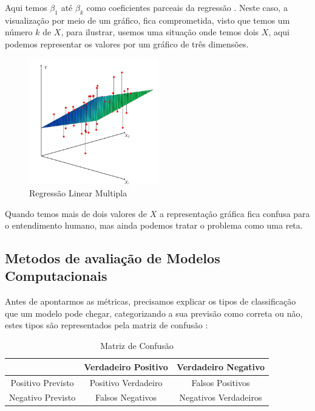 \documentclass[
    12pt,               %
    openright,          %
    oneside,            %
    a4paper,            %
    english,            %
    brazil              %
    ]{abntex2}
\begin{document}
Aqui temos $\beta_1$ até $\beta_k$ como coeficientes parceais da regressão \cite{modelos_regressao_linear}. 
Neste caso, a visualização por meio de um gráfico, fica comprometida, visto que temos um número $k$ de 
$X$, para ilustrar, usemos uma situação onde temos dois $X$, aqui podemos representar os valores por 
um gráfico de três dimensões.

\begin{figure}[H]
    \centering
    \caption{\label{Regressão Linear Multipla}Regressão Linear Multipla}
    \includegraphics[width=0.50\textwidth]{../imgs/reg_linear_multipla.png}
\end{figure}

Quando temos mais de dois valores de $X$ a representação gráfica fica confusa para o entendimento humano,
mas ainda podemos tratar o problema como uma reta.

\subsection{Metodos de avaliação de Modelos Computacionais}

Antes de apontarmos as métricas, precisamos explicar os tipos de classificação que um modelo pode chegar,
categorizando a sua previsão como correta ou não, estes tipos são representados pela matriz de confusão
\cite{acuracia_matriz}:

\begin{table}[H]
    \centering
    \caption{\label{Matriz de Confusão}Matriz de Confusão}
    \begin{tabular}{|c|c|c|}
    \hline
                      & Verdadeiro Positivo & Verdadeiro Negativo   \\ \hline
    Positivo Previsto & Positivo Verdadeiro & Falsos Positivos      \\ \hline
    Negativo Previsto & Falsos Negativos    & Negativos Verdadeiros \\ \hline
    \end{tabular}
\end{table}
\end{document}
